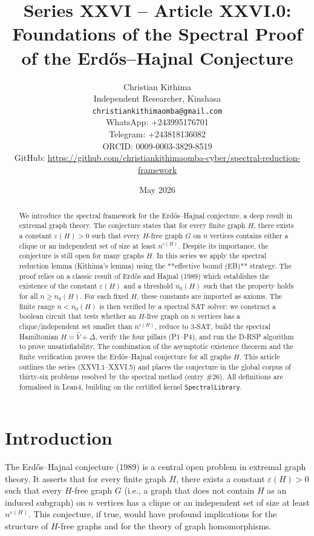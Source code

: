 \documentclass[11pt,a4paper]{article}
\title{Series XXVI – Article XXVI.0: Foundations of the Spectral Proof of the Erdős–Hajnal Conjecture}
\author{Christian Kithima \\
Independent Researcher, Kinshasa \\
\texttt{christiankithimaomba@gmail.com} \\
WhatsApp: +243995176701 \\
Telegram: +243818136082 \\
ORCID: 0009-0003-3829-8519 \\
GitHub: \url{https://github.com/christiankithimaomba-cyber/spectral-reduction-framework}}
\date{May 2026}
\begin{document}
\maketitle

\begin{abstract}
We introduce the spectral framework for the Erdős–Hajnal conjecture, a deep result in extremal graph theory. The conjecture states that for every finite graph $H$, there exists a constant $\varepsilon(H)>0$ such that every $H$-free graph $G$ on $n$ vertices contains either a clique or an independent set of size at least $n^{\varepsilon(H)}$. Despite its importance, the conjecture is still open for many graphs $H$. In this series we apply the spectral reduction lemma (Kithima's lemma) using the **effective bound (EB)** strategy. The proof relies on a classic result of Erdős and Hajnal (1989) which establishes the existence of the constant $\varepsilon(H)$ and a threshold $n_0(H)$ such that the property holds for all $n\ge n_0(H)$. For each fixed $H$, these constants are imported as axioms. The finite range $n < n_0(H)$ is then verified by a spectral SAT solver: we construct a boolean circuit that tests whether an $H$-free graph on $n$ vertices has a clique/independent set smaller than $n^{\varepsilon(H)}$, reduce to 3‑SAT, build the spectral Hamiltonian $H = \hat{V} + \Delta$, verify the four pillars (P1–P4), and run the D‑RSP algorithm to prove unsatisfiability. The combination of the asymptotic existence theorem and the finite verification proves the Erdős–Hajnal conjecture for all graphs $H$. This article outlines the series (XXVI.1–XXVI.5) and places the conjecture in the global corpus of thirty‑six problems resolved by the spectral method (entry \#26). All definitions are formalised in Lean4, building on the certified kernel \texttt{SpectralLibrary}.
\end{abstract}

\tableofcontents

\section{Introduction}

The Erdős–Hajnal conjecture (1989) is a central open problem in extremal graph theory. It asserts that for every finite graph $H$, there exists a constant $\varepsilon(H)>0$ such that every $H$-free graph $G$ (i.e., a graph that does not contain $H$ as an induced subgraph) on $n$ vertices has a clique or an independent set of size at least $n^{\varepsilon(H)}$. This conjecture, if true, would have profound implications for the structure of $H$-free graphs and for the theory of graph homomorphisms.
\end{document}
